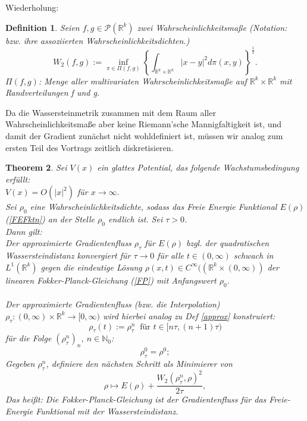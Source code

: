 \documentclass[11pt,a4paper,notitlepage]{scrreprt}
\newcommand{\RR}{\mathbb{R}}
\newcommand{\NN}{\mathbb{N}}
\newtheorem{defi}{Definition}[section]
\newtheorem{theorem}[defi]{Theorem}
\begin{document}
Wiederholung:
\begin{defi}
Seien $f,g\in\mathcal{P}(\RR^k)$ zwei Wahrscheinlichkeitsmaße (Notation: bzw. ihre assoziierten Wahrscheinlichkeitsdichten.)
\begin{equation}
W_2(f,g):=\inf_{\pi \in \Pi(f,g)} \left\{ \int_{\RR^k\times\RR^k} \vert x-y \vert^2 d\pi(x,y)\right\}^\frac{1}{2}.\label{W2}
\end{equation}
$\Pi(f,g)$: Menge aller multivariaten Wahrscheinlichkeitsmaße auf $\RR^k \times \RR^k$ mit Randverteilungen f und g.
\end{defi}
Da die Wassersteinmetrik zusammen mit dem Raum aller Wahrscheinlichkeitsmaße aber keine Riemann'sche Mannigfaltigkeit ist, und damit der Gradient zunächst nicht wohldefiniert ist, müssen wir analog zum ersten Teil des Vortrags zeitlich diskretisieren.\\


\begin{theorem}
Sei $V(x)$ ein glattes Potential, das folgende Wachstumsbedingung erfüllt: \\$V(x)=O(\vert x \vert^2)$ für $x\to\infty$. \\
Sei $\rho_0$ eine Wahrscheinlichkeitsdichte, sodass das Freie Energie Funktional $E(\rho)$ (\ref{FEFktn}) an der Stelle $\rho_0$ endlich ist. Sei $\tau>0$.\\
Dann gilt: \\
Der approximierte Gradientenfluss $\rho_\tau$  für $E(\rho)$ bzgl. der quadratischen Wassersteindistanz konvergiert für $\tau\to 0$ für alle $t\in(0,\infty)$ schwach in $L^1(\RR^k)$ gegen die eindeutige Lösung $\rho(x,t)\in C^\infty((\RR^k\times(0,\infty))$ der linearen Fokker-Planck-Gleichung (\ref{FP}) mit Anfangswert $\rho_0$.\\\\
Der approximierte Gradientenfluss (bzw. die Interpolation) $\rho_\tau:(0,\infty)\times\RR^k\to[0,\infty)$ wird hierbei analog zu Def \ref{approx} konstruiert:
\begin{equation}
\rho_\tau(t):=\rho_\tau^n ~\text{ für }t\in[n\tau,(n+1)\tau)
\end{equation}
für die Folge $(\rho_\tau^n)_n,~n\in\NN_0$:
\[\rho_\tau^0=\rho^0; \]
Gegeben $\rho_\tau^n$, definiere den nächsten Schritt als Minimierer von
\begin{equation} \rho \mapsto E(\rho)+\dfrac{W_2(\rho_\tau^n,\rho)^2}{2\tau}, \label{rho^n}
\end{equation}
Das heißt: Die Fokker-Planck-Gleichung ist der Gradientenfluss für das Freie-Energie Funktional mit der Wassersteindistanz.
\end{theorem}
\end{document}
